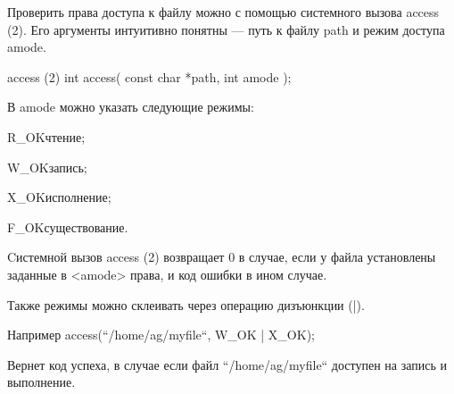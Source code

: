 Проверить права доступа к файлу можно с помощью системного вызова access (2). Его аргументы интуитивно понятны --- путь к файлу path и режим доступа amode.

\begin{CCode}{access (2)}
	int access(
		const char *path, 
		int amode
	); \end{CCode}

В amode можно указать следующие режимы:

	\begin{myenv}{R\_OK}{чтение;}
	\end{myenv}
	\begin{myenv}{W\_OK}{запись;}
	\end{myenv}
	\begin{myenv}{X\_OK}{исполнение;}
	\end{myenv}
	\begin{myenv}{F\_OK}{существование.}
	\end{myenv}

Cистемной вызов access (2) возвращает 0 в случае, если у файла установлены заданные в <amode> права, и код ошибки в ином случае. 

Также режимы можно склеивать через операцию дизъюнкции (|).

\begin{CCode}{Например}
	access(“/home/ag/myfile“, W_OK | X_OK); \end{CCode}

Вернет код успеха, в случае если файл “/home/ag/myfile“ доступен на запись и выполнение.


